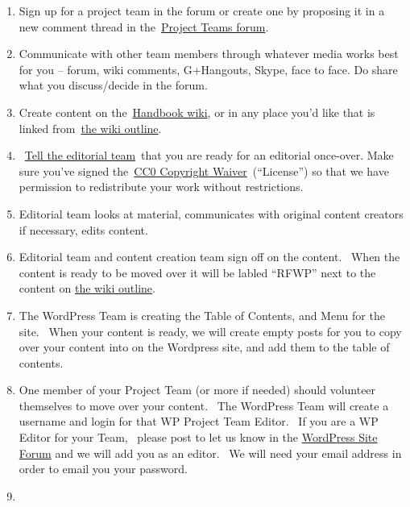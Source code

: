 \begin{enumerate}
\item
  Sign up for a project team in the forum or create one by proposing it
  in a new comment thread in
  the~\href{http://socialmediaclassroom.com/host/peeragogy/forums/project-teams}{Project
  Teams forum}.
\item
  Communicate with other team members through whatever media works best
  for you -- forum, wiki comments, G+Hangouts, Skype, face to face. Do
  share what you discuss/decide in the forum.
\item
  Create content on
  the~\href{http://socialmediaclassroom.com/host/peeragogy/wiki/main-page}{Handbook
  wiki}, or in any place you'd like that is linked
  from~\href{http://socialmediaclassroom.com/host/peeragogy/wiki/initial-outline-source-book}{the
  wiki outline}.
\item
  ~\href{http://socialmediaclassroom.com/host/peeragogy/forum/editorial-team}{Tell
  the editorial team}~that you are ready for an editorial once-over.
  Make sure you've signed
  the~\href{http://socialmediaclassroom.com/host/peeragogy/wiki/license}{CC0
  Copyright Waiver}~(``License'') so that we have permission to
  redistribute your work without restrictions.
\item
  Editorial team looks at material, communicates with original content
  creators if necessary, edits content.
\item
  Editorial team and content creation team sign off on the content.~
  When the content is ready to be moved over it will be labled ``RFWP''
  next to the content on
  \href{http://socialmediaclassroom.com/host/peeragogy/wiki/initial-outline-source-book}{the
  wiki outline}.
\item
  The WordPress Team is creating the Table of Contents, and Menu for the
  site.~ When your content is ready, we will create empty posts for you
  to copy over your content into on the Wordpress site, and add them to
  the table of contents.
\item
  One member of your Project Team (or more if needed) should volunteer
  themselves to move over your content.~ The WordPress Team will create
  a username and login for that WP Project Team Editor.~ If you are a WP
  Editor for your Team,~ please post to let us know in the
  \href{http://socialmediaclassroom.com/host/peeragogy/forum/the-wordpress-site}{WordPress
  Site Forum} and we will add you as an editor.~ We will need your email
  address in order to email you your password.
\item

\end{enumerate}
